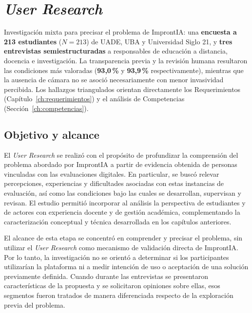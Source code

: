 \chapter{\textit{User Research}}
\label{ch:user_research}

\begin{chapterabstract}
Investigación mixta para precisar el problema de ImprontIA: una \textbf{encuesta a 213 estudiantes} ($N=213$) de UADE, UBA y Universidad Siglo 21, y \textbf{tres entrevistas semiestructuradas} a responsables de educación a distancia, docencia e investigación. La transparencia previa y la revisión humana resultaron las condiciones más valoradas (\textbf{93,0\,\%} y \textbf{93,9\,\%} respectivamente), mientras que la ausencia de cámara no se asoció necesariamente con menor invasividad percibida. Los hallazgos triangulados orientan directamente los Requerimientos (Capítulo~\ref{ch:requerimientos}) y el análisis de Competencias (Sección~\ref{ch:competencias}).
\end{chapterabstract}

\section{Objetivo y alcance}

El \textit{User Research} se realizó con el propósito de profundizar la comprensión del problema abordado por ImprontIA a partir de evidencia obtenida de personas vinculadas con las evaluaciones digitales. En particular, se buscó relevar percepciones, experiencias y dificultades asociadas con estas instancias de evaluación, así como las condiciones bajo las cuales se desarrollan, supervisan y revisan. El estudio permitió incorporar al análisis la perspectiva de estudiantes y de actores con experiencia docente y de gestión académica, complementando la caracterización conceptual y técnica desarrollada en los capítulos anteriores.

El alcance de esta etapa se concentró en comprender y precisar el problema, sin utilizar el \textit{User Research} como mecanismo de validación directa de ImprontIA. Por lo tanto, la investigación no se orientó a determinar si los participantes utilizarían la plataforma ni a medir intención de uso o aceptación de una solución previamente definida. Cuando durante las entrevistas se presentaron características de la propuesta y se solicitaron opiniones sobre ellas, esos segmentos fueron tratados de manera diferenciada respecto de la exploración previa del problema.

